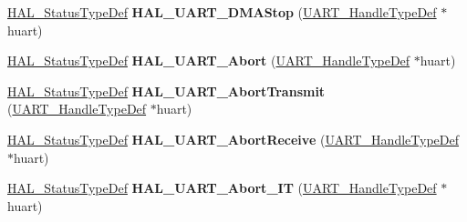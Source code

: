 \begin{DoxyCompactItemize}
\item 
\mbox{\label{group___u_a_r_t___exported___functions___group2_gab21aa06cfbaa1665b1062a803fcb4217}} 
\mbox{\hyperlink{stm32f7xx__hal__def_8h_a63c0679d1cb8b8c684fbb0632743478f}{H\+A\+L\+\_\+\+Status\+Type\+Def}} {\bfseries H\+A\+L\+\_\+\+U\+A\+R\+T\+\_\+\+D\+M\+A\+Stop} (\mbox{\hyperlink{group___u_a_r_t___exported___types_ga7adf4f3e4c3ecde572be5925c915a967}{U\+A\+R\+T\+\_\+\+Handle\+Type\+Def}} $\ast$huart)
\item 
\mbox{\label{group___u_a_r_t___exported___functions___group2_ga2d7be1f59fc810f49dadc580307a4862}} 
\mbox{\hyperlink{stm32f7xx__hal__def_8h_a63c0679d1cb8b8c684fbb0632743478f}{H\+A\+L\+\_\+\+Status\+Type\+Def}} {\bfseries H\+A\+L\+\_\+\+U\+A\+R\+T\+\_\+\+Abort} (\mbox{\hyperlink{group___u_a_r_t___exported___types_ga7adf4f3e4c3ecde572be5925c915a967}{U\+A\+R\+T\+\_\+\+Handle\+Type\+Def}} $\ast$huart)
\item 
\mbox{\label{group___u_a_r_t___exported___functions___group2_ga5a8858ffca45541416097961523d5fb2}} 
\mbox{\hyperlink{stm32f7xx__hal__def_8h_a63c0679d1cb8b8c684fbb0632743478f}{H\+A\+L\+\_\+\+Status\+Type\+Def}} {\bfseries H\+A\+L\+\_\+\+U\+A\+R\+T\+\_\+\+Abort\+Transmit} (\mbox{\hyperlink{group___u_a_r_t___exported___types_ga7adf4f3e4c3ecde572be5925c915a967}{U\+A\+R\+T\+\_\+\+Handle\+Type\+Def}} $\ast$huart)
\item 
\mbox{\label{group___u_a_r_t___exported___functions___group2_ga9732372cfae60c019bb41554ab12edd6}} 
\mbox{\hyperlink{stm32f7xx__hal__def_8h_a63c0679d1cb8b8c684fbb0632743478f}{H\+A\+L\+\_\+\+Status\+Type\+Def}} {\bfseries H\+A\+L\+\_\+\+U\+A\+R\+T\+\_\+\+Abort\+Receive} (\mbox{\hyperlink{group___u_a_r_t___exported___types_ga7adf4f3e4c3ecde572be5925c915a967}{U\+A\+R\+T\+\_\+\+Handle\+Type\+Def}} $\ast$huart)
\item 
\mbox{\label{group___u_a_r_t___exported___functions___group2_ga3183626ee21f103cbcb50241eca50e4d}} 
\mbox{\hyperlink{stm32f7xx__hal__def_8h_a63c0679d1cb8b8c684fbb0632743478f}{H\+A\+L\+\_\+\+Status\+Type\+Def}} {\bfseries H\+A\+L\+\_\+\+U\+A\+R\+T\+\_\+\+Abort\+\_\+\+IT} (\mbox{\hyperlink{group___u_a_r_t___exported___types_ga7adf4f3e4c3ecde572be5925c915a967}{U\+A\+R\+T\+\_\+\+Handle\+Type\+Def}} $\ast$huart)

\end{DoxyCompactItemize}
